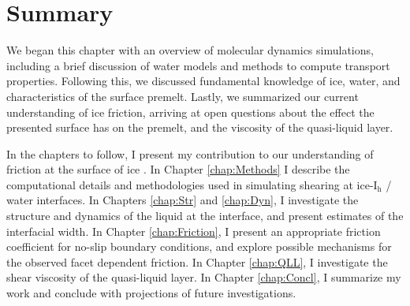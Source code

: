 



\section{Summary}
We began this chapter with an overview of molecular dynamics
simulations, including a brief discussion of water models and methods
to compute transport properties. Following this, we discussed
fundamental knowledge of ice, water, and characteristics of the
surface premelt. Lastly, we summarized our current
understanding of ice friction, arriving at open questions about the
effect the presented surface has on the premelt, and the
viscosity of the quasi-liquid layer.

In the chapters to follow, I present my contribution to our
understanding of friction at the surface of ice . In Chapter
\ref{chap:Methods} I describe the computational details and
methodologies used in simulating shearing at ice-I$_\mathrm{h}$ /
water interfaces. In Chapters \ref{chap:Str} and \ref{chap:Dyn}, I
investigate the structure and dynamics of the liquid at the interface,
and present estimates of the interfacial width. In Chapter
\ref{chap:Friction}, I present an appropriate friction coefficient for
no-slip boundary conditions, and explore possible mechanisms for the
observed facet dependent friction. In Chapter \ref{chap:QLL}, I
investigate the shear viscosity of the quasi-liquid layer. In Chapter
\ref{chap:Concl}, I summarize my work and conclude with projections
of future investigations.

